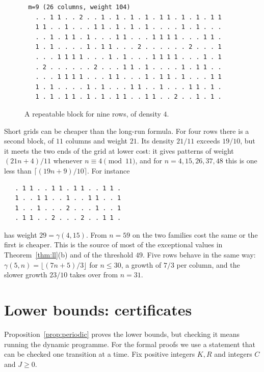 \documentclass[12pt]{article}
\newcommand{\fl}[1]{\lfloor #1 \rfloor}
\newcommand{\ce}[1]{\lceil #1 \rceil}
\theoremstyle{plain}
\theoremstyle{remark}
\begin{document}
\begin{figure}[ht]
\small
\begin{verbatim}
 m=9 (26 columns, weight 104)
   . . 1 1 . . 2 . . 1 . 1 . 1 . 1 . 1 1 . 1 . 1 . 1 1
   1 1 . . 1 . . . 1 1 . 1 . 1 . 1 . . . . 1 . 1 . . .
   . . 1 . 1 1 . 1 . . . 1 1 . . . 1 1 1 1 . . . 1 1 .
   1 . 1 . . . . 1 . 1 1 . . . 2 . . . . . . 2 . . . 1
   . . . 1 1 1 1 . . . 1 . 1 . . . 1 1 1 1 . . . 1 . 1
   . 2 . . . . . . 2 . . . 1 1 . 1 . . . . 1 . 1 1 . .
   . . . 1 1 1 1 . . . 1 1 . . . 1 . 1 1 . 1 . . . 1 1
   1 . 1 . . . . 1 . 1 . . . 1 1 . . 1 . . . 1 1 . 1 .
   1 . 1 . 1 1 . 1 . 1 . 1 1 . . 1 1 . . 2 . . 1 . 1 .
\end{verbatim}
\caption{A repeatable block for nine rows, of density $4$.}\label{fig:nine}
\end{figure}

Short grids can be cheaper than the long-run formula. For four rows there is a second block,
of $11$ columns and weight $21$. Its density $21/11$ exceeds $19/10$, but it meets the two ends
of the grid at lower cost: it gives patterns of weight $(21n+4)/11$ whenever
$n\equiv4\pmod{11}$, and for $n=4,15,26,37,48$ this is one less than $\ce{(19n+9)/10}$. For
instance
\begin{verbatim}
   . 1 1 . . 1 1 . 1 1 . . 1 1 .
   1 . . 1 1 . . 1 . . 1 1 . . 1
   1 . . 1 . . . 2 . . . 1 . . 1
   . 1 1 . . 2 . . . 2 . . 1 1 .
\end{verbatim}
has weight $29=\gamma(4,15)$. From $n=59$ on the two families cost the same or the first is
cheaper. This is the source of most of the exceptional values in Theorem~\ref{thm:ll}(b) and
of the threshold $49$. Five rows behave in the same way: $\gamma(5,n)=\fl{(7n+5)/3}$ for
$n\le30$, a growth of $7/3$ per column, and the slower growth $23/10$ takes over from $n=31$.

\section{Lower bounds: certificates}\label{sec:cert}

Proposition~\ref{prop:periodic} proves the lower bounds, but checking it means running the
dynamic programme. For the formal proofs we use a statement that can be checked one transition
at a time. Fix positive integers $K,R$ and integers $C$ and $J\ge0$.
\end{document}
